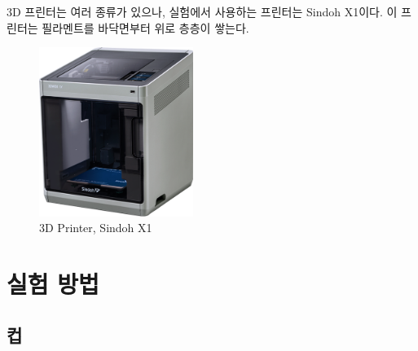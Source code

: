 \documentclass[a4paper, 10pt, nanum]{CSUniSchoolLabReport}
\begin{document}
	3D 프린터는 여러 종류가 있으나, 실험에서 사용하는 프린터는 Sindoh X1이다. 이 프린터는 필라멘트를 바닥면부터 위로 층층이 쌓는다. 
	\begin{figure}[htb!]
		\centering
		\includegraphics[width=5cm]{fig1.png}
		\caption{3D Printer, Sindoh X1}
		\label{fig:1}
	\end{figure}


\section{실험 방법}

\subsection{컵}
\end{document}
